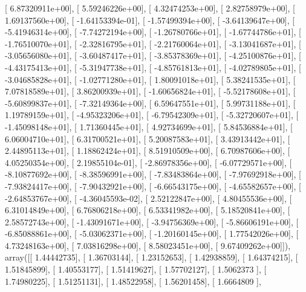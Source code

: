 \documentclass{article}
\begin{document}
       [  6.87320911e+00],
       [  5.59246226e+00],
       [  4.32474253e+00],
       [  2.82758979e+00],
       [  1.69137560e+00],
       [ -1.64153394e-01],
       [ -1.57499394e+00],
       [ -3.64139647e+00],
       [ -5.41946314e+00],
       [ -7.74272194e+00],
       [ -1.26780766e+01],
       [ -1.67744786e+01],
       [ -1.76510070e+01],
       [ -2.32816795e+01],
       [ -2.21760064e+01],
       [ -3.13041687e+01],
       [ -3.05656080e+01],
       [ -3.60487417e+01],
       [ -3.85378369e+01],
       [ -4.25100876e+01],
       [ -4.43175413e+01],
       [ -5.31947738e+01],
       [ -4.85761813e+01],
       [ -4.02789805e+01],
       [ -3.04685828e+01],
       [ -1.02771280e+01],
       [  1.80091018e+01],
       [  5.38241535e+01],
       [  7.07818589e+01],
       [  3.86200939e+01],
       [ -1.60656824e+01],
       [ -5.52178608e+01],
       [ -5.60899837e+01],
       [ -7.32149364e+00],
       [  6.59647551e+01],
       [  5.99731188e+01],
       [  1.19789159e+01],
       [ -4.95323206e+01],
       [ -6.79542309e+01],
       [ -5.32720607e+01],
       [ -1.45098148e+01],
       [  1.71360445e+01],
       [  4.92734699e+01],
       [  5.84536884e+01],
       [  6.06004710e+01],
       [  6.31700521e+01],
       [  5.20087583e+01],
       [  3.43913442e+01],
       [  2.44895113e+01],
       [  1.18862424e+01],
       [  8.51910509e+00],
       [  6.70987606e+00],
       [  4.05250354e+00],
       [  2.19855104e-01],
       [ -2.86978356e+00],
       [ -6.07729571e+00],
       [ -8.10877692e+00],
       [ -8.38596991e+00],
       [ -7.83483864e+00],
       [ -7.97692918e+00],
       [ -7.93824417e+00],
       [ -7.90432921e+00],
       [ -6.66543175e+00],
       [ -4.65582657e+00],
       [ -2.64853767e+00],
       [ -4.36045593e-02],
       [  2.52122847e+00],
       [  4.80455536e+00],
       [  6.31014849e+00],
       [  6.76806218e+00],
       [  6.53341982e+00],
       [  5.18520841e+00],
       [  2.58572743e+00],
       [ -1.43091671e+00],
       [ -3.94756369e+00],
       [ -5.86606191e+00],
       [ -6.85088861e+00],
       [ -5.03062371e+00],
       [ -1.20160145e+00],
       [  1.77542026e+00],
       [  4.73248163e+00],
       [  7.03816298e+00],
       [  8.58023451e+00],
       [  9.67409262e+00]]), array([[ 1.44442735],
       [ 1.36703144],
       [ 1.23152653],
       [ 1.42938859],
       [ 1.64374215],
       [ 1.51845899],
       [ 1.40553177],
       [ 1.51419627],
       [ 1.57702127],
       [ 1.5062373 ],
       [ 1.74980225],
       [ 1.51251131],
       [ 1.48522958],
       [ 1.56201458],
       [ 1.6664809 ],
\end{document}
